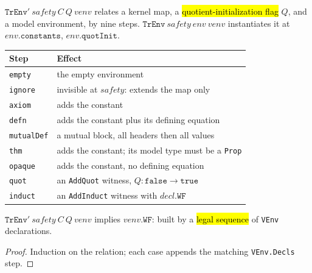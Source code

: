 \begin{definition}
\label{ind:tr-env}
\leanok
{}

 $\mathtt{TrEnv}'\ safety\ C\ Q\ venv$ relates a kernel map, a
\hl{quotient-initialization flag} $Q$, and a model environment, by nine steps.
$\mathtt{TrEnv}\ safety\ env\ venv$ instantiates it at $env.\mathtt{constants}$,
$env.\mathtt{quotInit}$.
\begin{center}
\begin{tabular}{@{}ll@{}}
\toprule
Step & Effect \\
\midrule
\texttt{empty} & the empty environment \\
\texttt{ignore} & invisible at $safety$: extends the map only \\
\texttt{axiom} & adds the constant \\
\texttt{defn} & adds the constant plus its defining equation \\
\texttt{mutualDef} & a mutual block, all headers then all values \\
\texttt{thm} & adds the constant; its model type must be a \texttt{Prop} \\
\texttt{opaque} & adds the constant, no defining equation \\
\texttt{quot} & an \texttt{AddQuot} witness, $Q\!:\mathtt{false}\to\mathtt{true}$ \\
\texttt{induct} & an \texttt{AddInduct} witness with $decl.\mathtt{WF}$ \\
\bottomrule
\end{tabular}\par\smallskip
\end{center}
\end{definition}

\begin{theorem}
\label{thm:tr-env-wf}
\leanok
{}

 $\mathtt{TrEnv}'\ safety\ C\ Q\ venv$ implies $venv.\mathtt{WF}$: built by a
\hl{legal sequence} of \texttt{VEnv} declarations.
\end{theorem}
\begin{proof}
\leanok
{} Induction on the relation; each case appends the matching \texttt{VEnv.Decls}
step.
\end{proof}

